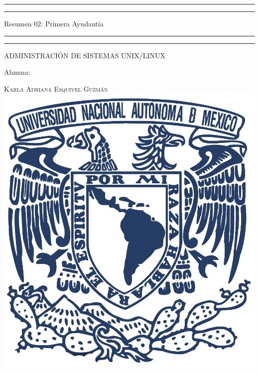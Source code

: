 \documentclass[a4paper, 11pt, oneside]{article}
\begin{document}
 

\begin{titlepage} 

	\centering 
	
	\scshape 
	
	\vspace*{\baselineskip} 
	
	
	
	\rule{\textwidth}{1.6pt}\vspace*{-\baselineskip}\vspace*{2pt} 
	\rule{\textwidth}{0.4pt} 
	
	\vspace{0.75\baselineskip} 
	
	{\LARGE Resumen 02: Primera Ayudantía}	
	\vspace{0.75\baselineskip} 
	
	\rule{\textwidth}{0.4pt}\vspace*{-\baselineskip}\vspace{3.2pt}
	\rule{\textwidth}{1.6pt} 
	
	\vspace{2\baselineskip} 
	

	ADMINISTRACIÓN DE SISTEMAS UNIX/LINUX
	
	\vspace*{3\baselineskip} 
	
	
	
	Alumna:
	
	\vspace{0.5\baselineskip} 
	
	{\scshape\Large Karla Adriana Esquivel Guzmán \\} 
	\vspace{0.5\baselineskip} 
	\vfill
	\includegraphics{unam.jpg}
	

\end{titlepage}
\end{document}
